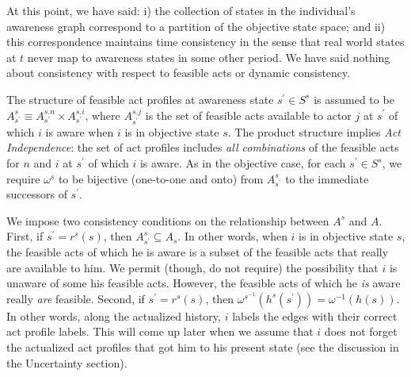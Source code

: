 \documentclass[
11pt,
titlepage,
reqno,
]{article}%
\theoremstyle{definition}
\begin{document}
At this point, we have said: i) the collection of states in the individual's awareness graph correspond to a partition of the objective state space; and ii)  this correspondence maintains time consistency in the sense that real world states at $t$ never map to awareness states in some other period. We have said nothing about consistency with respect to feasible acts or dynamic consistency. 

The structure of feasible act profiles at awareness state $s^\prime\in S^s$ is assumed to be $A^s_{s^\prime}\equiv A^{s.n}_{s^\prime}\times A^{s.i}_{s^\prime}$, where $A^{s.j}_{s^\prime}$ is the set of feasible acts available to actor $j$ at $s^\prime$ of which $i$ is aware when $i$ is in objective state $s$.
The product structure implies \textit{Act Independence}:  the set of act profiles includes \textit{all combinations} of the feasible acts for $n$ and $i$ at $s^\prime$ of which $i$ is aware. 
As in the objective case, for each $s^\prime\in S^s$, we require $\omega^s$ to be bijective (one-to-one and onto) from $A^s_{s^\prime}$ to the immediate successors of $s^\prime$.

We impose two consistency conditions on the relationship between $A^s$ and $A$.
First,  if $s^\prime=r^s(s)$, then $A^s_{s^\prime}\subseteq A_s$.
In other words, when $i$ is in objective state $s$, the feasible acts of which he is aware is a subset of the feasible acts that really are available to him.
We permit (though, do not require) the possibility that $i$ is unaware of some his feasible acts. 
However, the feasible acts of which he \textit{is} aware really \textit{are} feasible.
Second, if $s^\prime=r^s(s)$, then $\omega^{s^{-1}}(h^s(s^\prime))=\omega^{-1}(h(s))$. 
In other words, along the actualized history, $i$ labels the edges with their correct act profile labels.
This will come up later when we assume that $i$ does not forget the actualized act profiles that got him to his present state (see the discussion in the Uncertainty section).
\end{document}

